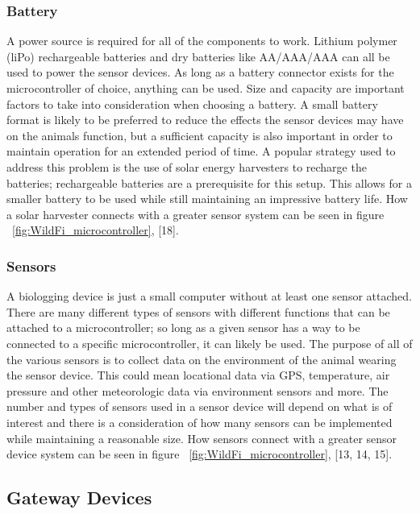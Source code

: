 \documentclass[sigplan,screen,nonacm]{acmart}
\begin{document}
\subsubsection{Battery}
\label{subsubsec:Battery}

A power source is required for all of the components to work. Lithium polymer (liPo) rechargeable batteries and 
dry batteries like AA/AAA/AAA can all be used to power the sensor devices. As long as a battery connector exists 
for the microcontroller of choice, anything can be used. Size and capacity are important factors to take into 
consideration when choosing a battery. A small battery format is likely to be preferred to reduce the effects the 
sensor devices may have on the animals function, but a sufficient capacity is also important in order to maintain 
operation for an extended period of time. A popular strategy used to address this problem is the use of solar 
energy harvesters to recharge the batteries; rechargeable batteries are a prerequisite for this setup. This allows 
for a smaller battery to be used while still maintaining an impressive battery life. How a solar harvester connects 
with a greater sensor system can be seen in figure ~\ref{fig:WildFi_microcontroller}, [18].

\subsubsection{Sensors}
\label{subsubsec:Sensors}

A biologging device is just a small computer without at least one sensor attached. There are many different types of 
sensors with different functions that can be attached to a microcontroller; so long as a given sensor has a way to be 
connected to a specific microcontroller, it can likely be used. The purpose of all of the various sensors is 
to collect data on the environment of the animal wearing the sensor device. This could mean locational data via GPS,   
temperature, air pressure and other meteorologic data via environment sensors and more. The number and types of sensors 
used in a sensor device will depend on what is of interest and there is a consideration of how many sensors can be 
implemented while maintaining a reasonable size. How sensors connect with a greater sensor device system can 
be seen in figure ~\ref{fig:WildFi_microcontroller}, [13, 14, 15].

\subsection{Gateway Devices}
\label{subsec:Gateway Devices}
\end{document}
